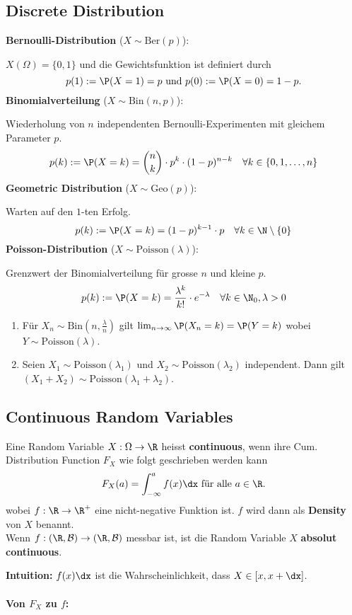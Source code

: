 \subsection{Discrete Distribution}
\textbf{Bernoulli-Distribution} ($X \sim \text{Ber}(p)$): 

$X(\Omega)= \{0, 1\}$ und die Gewichtsfunktion ist definiert durch
$$p(1):= \P(X = 1) = p \text{ und } p(0):=\P(X = 0) = 1 - p.$$
\textbf{Binomialverteilung} ($X \sim \text{Bin}(n, p)$): 

Wiederholung von $n$ independenten Bernoulli-Experimenten mit gleichem Parameter $p$. 
$$p(k):= \P(X = k) = \binom{n}{k} \cdot p^k \cdot (1-p)^{n-k} \quad \forall k \in \{0,1,\ldots, n\}$$
\textbf{Geometric Distribution} ($X \sim \text{Geo}(p)$): 

Warten auf den $1$-ten Erfolg. 
$$p(k):= \P(X = k) = (1-p)^{k-1}\cdot p \quad \forall k \in \N\setminus\{0\}$$
\textbf{Poisson-Distribution} ($X \sim \text{Poisson}(\lambda)$): 

Grenzwert der Binomialverteilung für grosse $n$ und kleine $p$. 
$$p(k) := \P(X = k) = \frac{\lambda^k}{k!}\cdot e^{-\lambda} \quad \forall k \in \N_0, \lambda > 0$$
\begin{enumerate}
    \item Für $X_n \sim \text{Bin}(n, \frac{\lambda}{n})$ gilt $\lim_{n \to \infty}\P(X_n = k) = \P(Y = k)$ wobei $Y \sim \text{Poisson}(\lambda)$.
    \item Seien $X_1 \sim \text{Poisson}(\lambda_1)$ und $X_2 \sim \text{Poisson}(\lambda_2)$ independent. Dann gilt $(X_1 + X_2) \sim \text{Poisson}(\lambda_1 +\lambda_2)$.
\end{enumerate}

\subsection{Continuous Random Variables}
\begin{mainbox}{}
    Eine Random Variable $X: \Omega \to \R$ heisst \textbf{continuous}, wenn ihre Cum. Distribution Function $F_X$ wie folgt geschrieben werden kann
    $$F_X(a) = \int_{-\infty}^{a}f(x)\dx \text{ für alle }a \in \R.$$
    wobei $f: \R \to \R^+$ eine nicht-negative Funktion ist. $f$ wird dann als \textbf{Density} von $X$ benannt.\\
    Wenn $f: (\R, \mathcal{B}) \to (\R, \mathcal{B})$ messbar ist, ist die Random Variable $X$ \textbf{absolut continuous}.
\end{mainbox}
\textbf{Intuition:} $f(x)\dx$ ist die Wahrscheinlichkeit, dass $X \in [x, x + \dx]$.
\\ \\
\textbf{Von $F_X$ zu $f$:} 

